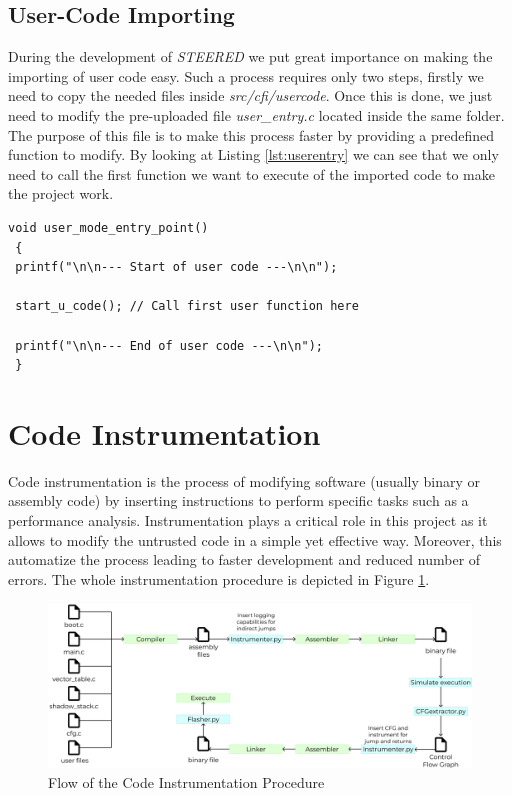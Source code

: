 \subsection{User-Code Importing}
\label{subsec:project_ucodeimport}

During the development of \textit{STEERED} we put great importance on making the
importing of user code easy. Such a process requires only two steps, firstly we need
to copy the needed files inside \textit{src/cfi/usercode}. Once this is done, we
just need to modify the pre-uploaded file \textit{user\_entry.c} located inside the
same folder. The purpose of this file is to make this process faster by
providing a predefined function to modify. By looking at Listing \ref{lst:userentry}
we can see that we only need to call the first function we want to execute of the
imported code to make the project work.

\begin{lstlisting}[style=CStyle, caption = \textit{user\_entry.c} File, label={lst:userentry}]
void user_mode_entry_point()
 {
 printf("\n\n--- Start of user code ---\n\n");

 start_u_code(); // Call first user function here

 printf("\n\n--- End of user code ---\n\n");
 }
\end{lstlisting}

\section{Code Instrumentation}
\label{sec:project_instrumentation}

Code instrumentation is the process of modifying software (usually binary or
assembly code) by inserting instructions to perform specific tasks such as a performance
analysis. Instrumentation plays a critical role in this project as it allows to
modify the untrusted code in a simple yet effective way. Moreover, this
automatize the process leading to faster development and reduced number of
errors. The whole instrumentation procedure is depicted in Figure \ref{fig:instrumentation}.
\\
\begin{figure}[htbp]
  \centering
  \includegraphics[width=.9\linewidth]{images/instrumentation.png}
  \caption{Flow of the Code Instrumentation Procedure}
  \label{fig:instrumentation}
\end{figure}
\\

